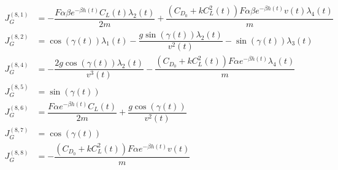 \begin{align}
    J_G^{(8,1)} &= -\dfrac{F \alpha \beta e^{-\beta h(t)} C_L(t) \lambda_2(t)}{2m}  + \dfrac{(C_{D_0} + k C_L^2(t)) F \alpha \beta e^{-\beta h(t)} v(t) \lambda_4(t)}{m} \\
    J_G^{(8,2)} &= \cos(\gamma(t)) \lambda_1(t) - \dfrac{g \sin(\gamma(t)) \lambda_2(t)}{v^2(t)} - \sin(\gamma(t)) \lambda_3(t) \\
    J_G^{(8,4)} &= - \dfrac{2 g \cos(\gamma(t)) \lambda_2(t)}{v^3(t)} - \dfrac{(C_{D_0} + k C_L^2(t)) F \alpha e^{-\beta h(t)} \lambda_4(t)}{m} \\
    J_G^{(8,5)} &= \sin(\gamma(t)) \\
    J_G^{(8,6)} &= \dfrac{F \alpha e^{-\beta h(t)} C_L(t)}{2m} + \dfrac{g \cos(\gamma(t))}{v^2(t)} \\
    J_G^{(8,7)} &= \cos(\gamma(t)) \\
    J_G^{(8,8)} &= - \dfrac{(C_{D_0} + k C_L^2(t)) F \alpha e^{-\beta h(t)} v(t)}{m} 
\end{align}